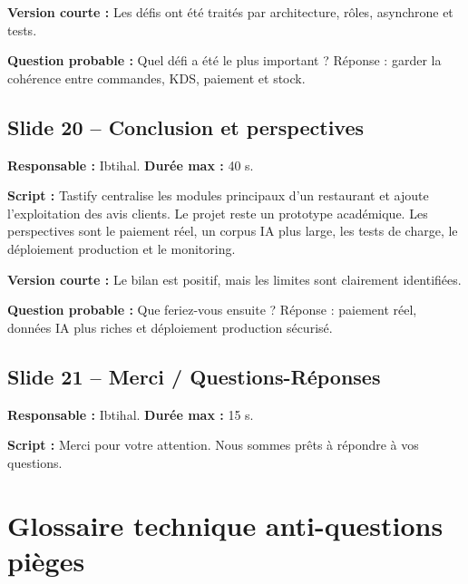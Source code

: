 \documentclass[11pt,a4paper]{article}
\begin{document}
\textbf{Version courte :} Les défis ont été traités par architecture, rôles, asynchrone et tests.

\textbf{Question probable :} Quel défi a été le plus important ? Réponse : garder la cohérence entre commandes, KDS, paiement et stock.

\subsection*{Slide 20 -- Conclusion et perspectives}
\textbf{Responsable :} Ibtihal. \textbf{Durée max :} 40 s.

\textbf{Script :} Tastify centralise les modules principaux d'un restaurant et ajoute l'exploitation des avis clients. Le projet reste un prototype académique. Les perspectives sont le paiement réel, un corpus IA plus large, les tests de charge, le déploiement production et le monitoring.

\textbf{Version courte :} Le bilan est positif, mais les limites sont clairement identifiées.

\textbf{Question probable :} Que feriez-vous ensuite ? Réponse : paiement réel, données IA plus riches et déploiement production sécurisé.

\subsection*{Slide 21 -- Merci / Questions-Réponses}
\textbf{Responsable :} Ibtihal. \textbf{Durée max :} 15 s.

\textbf{Script :} Merci pour votre attention. Nous sommes prêts à répondre à vos questions.

\section{Glossaire technique anti-questions pièges}
\end{document}

